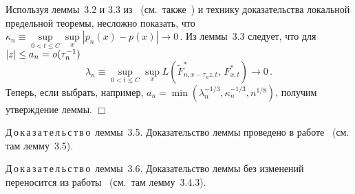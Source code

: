 Используя леммы~3.2 и 3.3 из~\cite{5ben} (см.\ также~\cite{6ben}) и технику доказательства 
локальной предельной теоремы, несложно показать, что
$
\kappa_n\equiv\sup\limits_{0<t\leq C}\sup\limits_{x}\left| p_n(x)-p(x) \right|\rightarrow 0\,.
$
Из леммы~3.3 следует, что для $|z|\leq a_n={\it o}(\tau_n^{-1})$
$$
\lambda_n\equiv\sup\limits_{0<t\leq C}\sup\limits_{x}L\left( 
\tilde F_{n,x-\tau_nz,t}^{*},\, F_{x,t}^{*}\right)\rightarrow 0\,.
$$
Теперь, если выбрать, например,
$
a_n=\min(\lambda_n^{-1/3},\kappa_n^{-1/3},n^{1/8})$, получим утверждение леммы.\hfill
$\Box$


\noindent
Д\,о\,к\,а\,з\,а\,т\,е\,л\,ь\,с\,т\,в\,о~леммы~3.5. Доказательство леммы проведено в работе~\cite{5ben} (см.
 там лемму~3.5).

\smallskip

\noindent
Д\,о\,к\,а\,з\,а\,т\,е\,л\,ь\,с\,т\,в\,о~леммы~3.6. Доказательство леммы без изменений переносится из 
работы~\cite{1ben} (см.\ там лемму~3.4.3).

\smallskip

